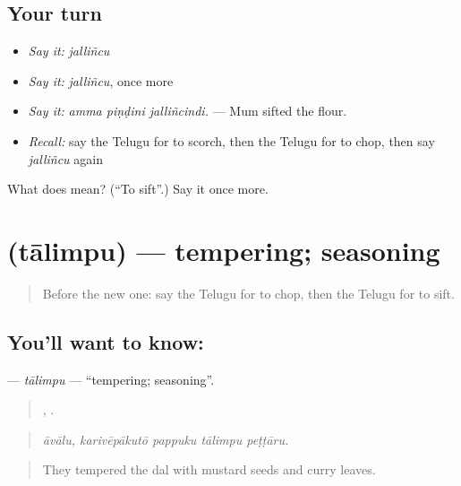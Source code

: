 \subsection*{Your turn}
\begin{itemize}
\raggedright
  \item \emph{Say it:} \emph{jalliñcu}
  \item \emph{Say it:} \emph{jalliñcu}, once more
  \item \emph{Say it:} \emph{amma piṇḍini jalliñcindi.} — Mum sifted the flour.
  \item \emph{Recall:} say the Telugu for to scorch, then the Telugu for to chop, then say \emph{jalliñcu} again
\end{itemize}

\begin{tcolorbox}[breakable,colback=teal!4,colframe=teal!35!black,title={Before you move on}]
What does  mean? (\textquotedblleft{}To sift\textquotedblright{}.) Say it once more.
\end{tcolorbox}
\section[\texorpdfstring{\te{తాలింపు} (tālimpu)}{తాలింపు (tālimpu)}]{ (tālimpu) — tempering; seasoning}

\label{lesson:TE-C548-talimpu}



\begin{quote}
Before the new one: say the Telugu for to chop, then the Telugu for to sift.
\end{quote}

\subsection*{You'll want to know: }
\textbf{} — \emph{tālimpu} — \textquotedblleft{}tempering; seasoning\textquotedblright{}.

\begin{quote}
,    .
\end{quote}

\begin{quote}
\emph{āvālu, karivēpākutō pappuku tālimpu peṭṭāru.}
\end{quote}

\begin{quote}
They tempered the dal with mustard seeds and curry leaves.
\end{quote}

